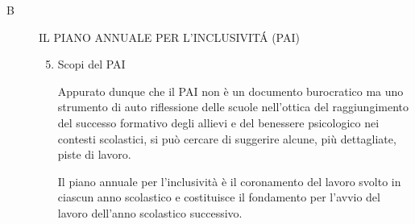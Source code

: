 \begin{description}
\begin{enumerate}
	\end{enumerate}
	\item [B] IL PIANO ANNUALE PER L’INCLUSIVIT\'{A} (PAI)
	\begin{enumerate}
		\setcounter{enumi}{4}
		\item Scopi del PAI
		
		Appurato dunque che il PAI non è un documento burocratico ma uno strumento di auto riflessione
		delle scuole nell'ottica del raggiungimento del successo formativo degli allievi e del benessere
		psicologico nei contesti scolastici, si può cercare di suggerire alcune, più dettagliate, piste di lavoro.
		
		Il piano annuale per l'inclusività è il coronamento del lavoro svolto in ciascun anno scolastico e
		costituisce il fondamento per l'avvio del lavoro dell'anno scolastico successivo.
		

\end{enumerate}
\end{description}
